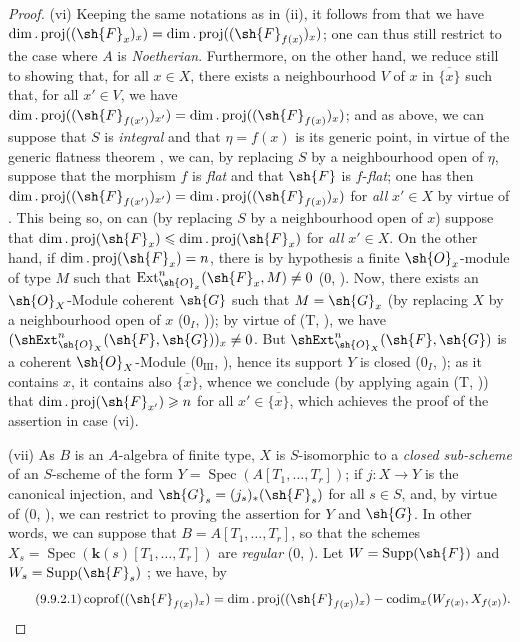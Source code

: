 \begin{proof}
(vi) Keeping the same notations as in (ii), it follows from  that we have $\dim.\operatorname{proj}((\sh{F}_x)_x)=\dim.\operatorname{proj}((\sh{F}_{f(x)})_x)$; one can thus still restrict to the case where $A$ is \emph{Noetherian}.
Furthermore, on the other hand, we reduce still to showing that, for all $x\in X$, there exists a neighbourhood $V$ of $x$ in $\overline{\{x\}}$ such that, for all $x'\in V$, we have $\dim.\operatorname{proj}((\sh{F}_{f(x')})_{x'})=\dim.\operatorname{proj}((\sh{F}_{f(x)})_x)$; and as above, we can suppose that $S$ is \emph{integral} and that $\eta=f(x)$ is its generic point, in virtue of the generic flatness theorem , we can, by replacing $S$ by a neighbourhood open of $\eta$, suppose that the morphism $f$ is \emph{flat} and that $\sh{F}$ is $f$-\emph{flat}; one has then $\dim.\operatorname{proj}((\sh{F}_{f(x')})_{x'})=\dim.\operatorname{proj}((\sh{F}_{f(x)})_x)$ for \emph{all} $x'\in X$ by virtue of .
This being so, on can (by replacing $S$ by a neighbourhood open of $x$) suppose that $\dim.\operatorname{proj}(\sh{F}_x)\leqslant\dim.\operatorname{proj}(\sh{F}_x)$ for \emph{all} $x'\in X$.
On the other hand, if $\dim.\operatorname{proj}(\sh{F}_x)=n$, there is by hypothesis a finite $\sh{O}_x$-module of type $M$ such that $\operatorname{Ext}^n_{\sh{O}_x}(\sh{F}_x,M)\neq 0$ ($0$, ).
Now, there exists an $\sh{O}_X$-Module coherent $\sh{G}$ such that $M=\sh{G}_x$ (by replacing $X$ by a neighbourhood open of $x$ ($0_I$, ));
by virtue of (T, ), we have $(\shExt^n_{\sh{O}_X}(\sh{F},\sh{G}))_x\neq 0$.
But $\shExt^n_{\sh{O}_X}(\sh{F},\sh{G})$ is a coherent $\sh{O}_X$-Module ($0_{\mathrm{III}}$, ), hence its support $Y$ is closed ($0_I$, ); as it contains $x$, it contains also $\overline{\{x\}}$, whence we conclude (by applying again (T, )) that $\dim.\operatorname{proj}(\sh{F}_{x'})\geqslant n$ for all $x'\in\overline{\{x\}}$, which achieves the proof of the assertion in case (vi).

(vii) As $B$ is an $A$-algebra of finite type, $X$ is $S$-isomorphic to a \emph{closed sub-scheme} of an $S$-scheme of the form $Y=\operatorname{Spec}(A[T_1,\ldots,T_r])$; if $j:X\to Y$ is the canonical injection, and $\sh{G}_s=(j_s)_*(\sh{F}_s)$ for all $s\in S$, and, by virtue of ($0$, ), we can restrict to proving the assertion for $Y$ and $\sh{G}$.
In other words, we can suppose that $B=A[T_1,\ldots,T_r]$, so that the schemes $X_s=\operatorname{Spec}(\mathbf{k}(s)[T_1,\ldots,T_r])$ are \emph{regular} ($0$, ).
Let $W=\operatorname{Supp}(\sh{F})$ and $W_s=\operatorname{Supp}(\sh{F}_s)$ ; we have, by 
\begin{equation}
\tag{9.9.2.1}
\label{IV.9.9.2.1}
  \operatorname{coprof}((\sh{F}_{f(x)})_x)=\dim.\operatorname{proj}((\sh{F}_{f(x)})_x)-\operatorname{codim}_x(W_{f(x)},X_{f(x)}).
\end{equation}


\end{proof}
